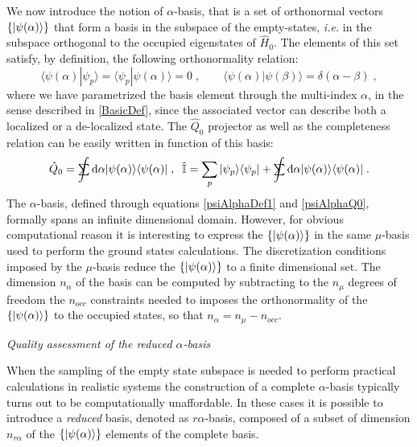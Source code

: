 \documentclass[a4paper]{article}
\newcommand{\dd}{{\rm d}}
\newcommand{\sint}{\mathrlap{\displaystyle\int}
\mathrlap{\textstyle\sum}
\phantom{\mathrlap{\displaystyle
\int}\textstyle\sum}}
\newcommand{\be}{\begin{equation}}
\newcommand{\ee}{\end{equation}}
\newcommand{\qq}{\qquad}
\newcommand{\lb}{\label}
\newcommand{\op}[1]{\hat {#1}}
\newcommand{\brket}[2]{\langle  #1 | #2 \rangle} %
\newcommand{\ketbra}[2]{| #1 \rangle \langle #2 |}
\newcommand{\hnot}{\op{H}_0}
\newcommand{\identity}{\op{\mathbb I}}
\begin{document}
We now introduce the notion of $\alpha$-basis, that is a set of orthonormal vectors $\{\ket{\psi(\alpha)}\}$ that form a basis in the subspace of the empty-states, \emph{i.e.} in the subspace 
orthogonal to the occupied eigenstates of $\hnot$. The elements of this set satisfy, by definition, the following orthonormality relation: 
\be\lb{psiAlphaDef1}
\brket{\psi(\alpha)}{\psi_p} = \brket{\psi_p}{\psi(\alpha)} = 0 \;, \qq
\brket{\psi(\alpha)}{\psi(\beta)} = \delta(\alpha-\beta) \;,
\ee
where we have parametrized the basis element through the multi-index $\alpha$, in the sense described in \ref{BasicDef}, since the associated vector can describe both a localized or a 
de-localized state. The $\op Q_0$ projector as well as the completeness relation can be easily written in function of this basis: 
\be\lb{psiAlphaQ0}
\op Q_0 = \sint\dd\alpha\ketbra{\psi(\alpha)}{\psi(\alpha)} \;, \;\; 
\identity = \sum_p\ketbra{\psi_p}{\psi_p} + \sint\dd\alpha\ketbra{\psi(\alpha)}{\psi(\alpha)} \;.
\ee
The $\alpha$-basis, defined through equations \eqref{psiAlphaDef1} and \eqref{psiAlphaQ0}, formally spans an infinite dimensional domain. However, for obvious computational reason it is 
interesting to express the $\{\ket{\psi(\alpha)}\}$ in the same $\mu$-basis used to perform the ground states calculations. The discretization conditions imposed by the $\mu$-basis reduce 
the $\{\ket{\psi(\alpha)}\}$ to a finite dimensional set. The dimension $n_\alpha$ of the basis can be computed by subtracting to the $n_\mu$ degrees of freedom the $n_{occ}$ constraints 
needed to imposes the orthonormality of the $\{\ket{\psi(\alpha)}\}$ to the occupied states, so that $n_\alpha=n_\mu-n_{occ}$.

\vspace{0.4cm}
\emph{Quality assessment of the reduced $\alpha$-basis}
\vspace{0.4cm}

When the sampling of the empty state subspace is needed to perform practical calculations in realistic systems the construction of a complete $\alpha$-basis typically turns out to be 
computationally unaffordable. In these cases it is possible to introduce a \emph{reduced} basis, denoted as $r\alpha$-basis, composed of a subset of dimension $n_{r\alpha}$ of the 
$\{\ket{\psi(\alpha)}\}$ elements of the complete basis. 
\end{document}
